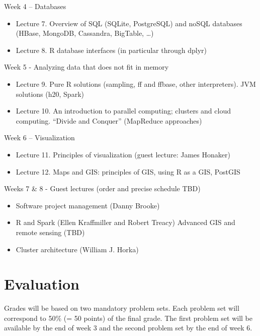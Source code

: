 \documentclass[]{book}
\providecommand{\tightlist}{%
  \setlength{\itemsep}{0pt}\setlength{\parskip}{0pt}}
\theoremstyle{definition}
\theoremstyle{definition}
\theoremstyle{definition}
\theoremstyle{remark}
\begin{document}
Week 4 -- Databases

\begin{itemize}
\tightlist
\item
  Lecture 7. Overview of SQL (SQLite, PostgreSQL) and noSQL databases
  (HBase, MongoDB, Cassandra, BigTable, \ldots{})
\item
  Lecture 8. R database interfaces (in particular through dplyr)
\end{itemize}

Week 5 - Analyzing data that does not fit in memory

\begin{itemize}
\tightlist
\item
  Lecture 9. Pure R solutions (sampling, ff and ffbase, other
  interpreters). JVM solutions (h20, Spark)
\item
  Lecture 10. An introduction to parallel computing; clusters and cloud
  computing. ``Divide and Conquer'' (MapReduce approaches)
\end{itemize}

Week 6 -- Visualization

\begin{itemize}
\tightlist
\item
  Lecture 11. Principles of visualization (guest lecture: James Honaker)
\item
  Lecture 12. Maps and GIS: principles of GIS, using R as a GIS, PostGIS
\end{itemize}

Weeks 7 \& 8 - Guest lectures (order and precise schedule TBD)

\begin{itemize}
\tightlist
\item
  Software project management (Danny Brooke)
\item
  R and Spark (Ellen Kraffmiller and Robert Treacy) Advanced GIS and
  remote sensing (TBD)
\item
  Cluster architecture (William J. Horka)
\end{itemize}

\section{Evaluation}\label{evaluation}

Grades will be based on two mandatory problem sets. Each problem set
will correspond to 50\% (= 50 points) of the final grade. The first
problem set will be available by the end of week 3 and the second
problem set by the end of week 6.
\end{document}
